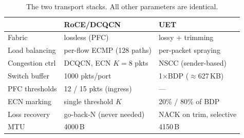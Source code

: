 \documentclass[conference]{IEEEtran}
\begin{document}
\begin{table}[t]
\centering
\caption{The two transport stacks. All other parameters are identical.}
\label{tab:stacks}
\footnotesize
\setlength{\tabcolsep}{4pt}
\begin{tabular}{@{}lll@{}}
\toprule
 & \textbf{RoCE/DCQCN} & \textbf{UET} \\
\midrule
Fabric          & lossless (PFC)            & lossy + trimming \\
Load balancing  & per-flow ECMP (128 paths) & per-packet spraying \\
Congestion ctrl & DCQCN, ECN $K{=}8$ pkts   & NSCC (sender-based) \\
Switch buffer   & 1000 pkts/port            & 1$\times$BDP ($\approx$627\,KB) \\
PFC thresholds  & 12 / 15 pkts (ingress)    & --- \\
ECN marking     & single threshold $K$      & 20\% / 80\% of BDP \\
Loss recovery   & go-back-N (never needed)  & NACK on trim, selective \\
MTU             & 4000\,B                   & 4150\,B \\
\bottomrule
\end{tabular}
\end{table}

\end{document}
